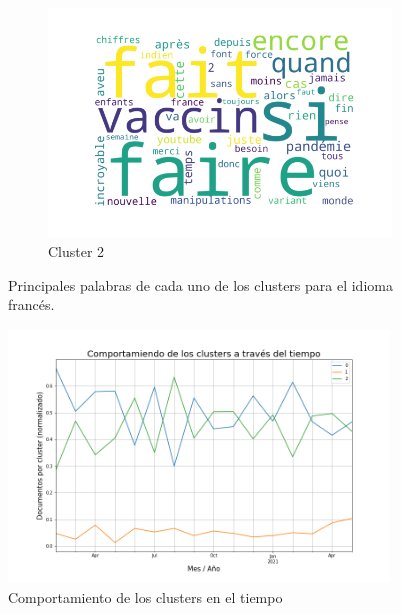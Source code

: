 \begin{figure}
\begin{subfigure}[b]{0.49\textwidth}
        \includegraphics[width=\textwidth]{results/TopicDetection/fr/cluster3_2.png}
        \caption{Cluster 2}
        \label{fig:fr_c2}
    \end{subfigure}
    \hfill
    \caption{Principales palabras de cada uno de los clusters para el idioma francés.}
    \label{fig:es_clusters}
\end{figure}

\begin{figure}
    \centering
    \includegraphics[width=0.9\textwidth]{results/TopicDetection/fr/cluster_over_time_3.png}
    \caption{Comportamiento de los clusters en el tiempo}
    \label{fig:fr_time}
\end{figure}

